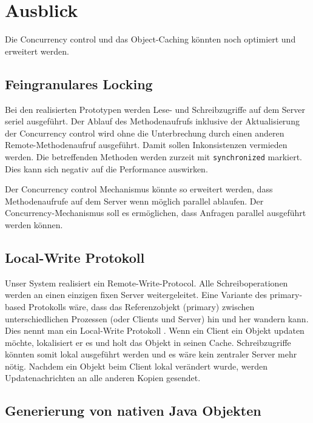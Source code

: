 \chapter{Ausblick}

Die Concurrency control und das Object-Caching könnten noch optimiert und erweitert werden.


\section{Feingranulares Locking}
\label{sec:feingr-lock}

Bei den realisierten Prototypen werden Lese- und Schreibzugriffe auf dem Server seriel ausgeführt. Der Ablauf des Methodenaufrufs inklusive der Aktualisierung der Concurrency control wird ohne die Unterbrechung durch einen anderen Remote-Methodenaufruf ausgeführt. Damit sollen Inkonsistenzen vermieden werden. Die betreffenden Methoden werden zur\-zeit mit \texttt{syn\-chro\-ni\-zed} markiert. Dies kann sich negativ auf die Performance auswirken. 

Der Concurrency control Mechanismus könnte so erweitert werden, dass Methodenaufrufe auf dem Server wenn möglich parallel ablaufen. 
Der Concurrency-Mechanismus soll es ermöglichen, dass Anfragen parallel ausgeführt werden können.

\section{Local-Write Protokoll}
\label{sec:local-write-prot}

Unser System realisiert ein Remote-Write-Protocol. Alle Schreiboperationen werden an einen einzigen fixen Server weitergeleitet.
Eine Variante des primary-based Protokolls wäre, dass das Referenzobjekt (primary) zwischen unterschiedlichen Prozessen (oder Clients und Server) hin und her wandern kann. Dies nennt man ein Local-Write Protokoll \cite{tanenbaum07}. Wenn ein Client ein Objekt updaten möchte, lokalisiert er es und holt das Objekt in seinen Cache. Schreibzugriffe könnten somit lokal ausgeführt werden und es wäre kein zentraler Server mehr nötig. Nachdem ein Objekt beim Client lokal verändert wurde, werden Updatenachrichten an alle anderen Kopien gesendet.

\section{Generierung von nativen Java Objekten}
\label{sec:gener-von-nativ}

